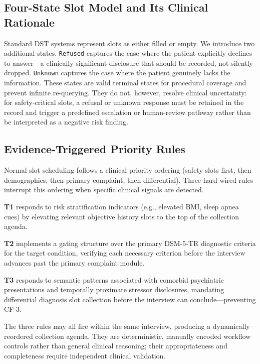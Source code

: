 \documentclass[conference]{IEEEtran}
\begin{document}
\subsection{Four-State Slot Model and Its Clinical Rationale}

Standard DST systems represent slots as either filled or empty. We introduce two additional states. \texttt{Refused} captures the case where the patient explicitly declines to answer---a clinically significant disclosure that should be recorded, not silently dropped. \texttt{Unknown} captures the case where the patient genuinely lacks the information. These states are valid terminal states for procedural coverage and prevent infinite re-querying. They do not, however, resolve clinical uncertainty: for safety-critical slots, a refusal or unknown response must be retained in the record and trigger a predefined escalation or human-review pathway rather than be interpreted as a negative risk finding.

\subsection{Evidence-Triggered Priority Rules}

Normal slot scheduling follows a clinical priority ordering (safety slots first, then demographics, then primary complaint, then differential). Three hard-wired rules interrupt this ordering when specific clinical signals are detected.

\textbf{T1} responds to risk stratification indicators (e.g., elevated BMI, sleep apnea cues) by elevating relevant objective history slots to the top of the collection agenda.

\textbf{T2} implements a gating structure over the primary DSM-5-TR diagnostic criteria for the target condition, verifying each necessary criterion before the interview advances past the primary complaint module.

\textbf{T3} responds to semantic patterns associated with comorbid psychiatric presentations and temporally proximate stressor disclosures, mandating differential diagnosis slot collection before the interview can conclude---preventing CF-3.

The three rules may all fire within the same interview, producing a dynamically reordered collection agenda. They are deterministic, manually encoded workflow controls rather than general clinical reasoning; their appropriateness and completeness require independent clinical validation.
\end{document}
